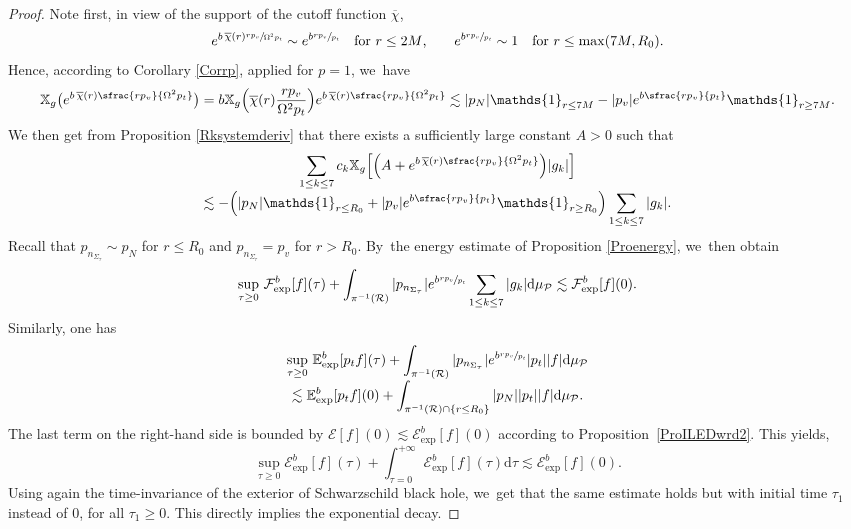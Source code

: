 \documentclass[JEP,XML,SOM,Unicode,published]{cedram}
\theoremstyle{plain}
\theoremstyle{definition}
\newcommand\T{{\mathbb{X}}}
\newcommand\dr{{\mathrm{d}}}
\begin{document}
\begin{proof}
Note first, in view of the support of the cutoff function $\overline{\chi}$,\vspace*{-3pt}
\[
e^{b \, \overline{\chi}(r) \sfrac{rp_v}{\Omega^2p_t}} \sim e^{b \sfrac{rp_v}{p_t}} \quad \text{for $r \leq 2M$,}\qquad e^{b \sfrac{rp_v}{p_t}} \sim 1 \quad \text{for $r \leq \max (7M,R_0)$}.
\]
Hence, according to Corollary \ref{Corrp}, applied for $p=1$, we~have\vspace*{-2pt}
\[
\T_g \bigl(e^{b \, \overline{\chi}(r) \sfrac{rp_v}{\Omega^2p_t}} \bigr) = b\T_g \Bigl(\overline{\chi}(r) \frac{rp_v}{\Omega^2p_t} \Bigr) e^{b \, \overline{\chi}(r) \sfrac{rp_v}{\Omega^2p_t}} \lesssim |p_N| \mathds{1}_{r \leq 7M} -|p_v| e^{b \sfrac{rp_v}{p_t}} \mathds{1}_{r \geq 7M}.
\]
We then get from Proposition \ref{Rksystemderiv} that there exists a sufficiently large constant $A>0$ such that
\begin{multline}
\sum_{1 \leq k \leq 7} c_k \T_g \Bigl[\Bigl(A+e^{b \, \overline{\chi}(r) \sfrac{rp_v}{\Omega^2p_t}} \Bigr)|g_k| \Bigr]\\[-3pt]
\lesssim -\Bigl(|p_N| \mathds{1}_{r \leq R_0} + |p_v|e^{b \sfrac{rp_v}{p_t}} \mathds{1}_{r \geq R_0} \Bigr) \sum_{1 \leq k \leq 7} |g_k|.
\end{multline}
Recall that $p_{n_{\Sigma_\tau}} \sim p_N$ for $r \leq R_0$ and $p_{n_{\Sigma_\tau}} = p_v$ for $r >R_0$. By~the energy estimate of Proposition \ref{Proenergy}, we~then obtain
\[
\sup_{\tau \geq 0}\, \mathcal{F}_{\mathrm{exp}}^b [f](\tau)+\int_{\pi^{-1}(\mathcal{R})} |p_{n_{\Sigma_\tau}}|e^{b \sfrac{rp_v}{p_t}} \sum_{1 \leq k \leq 7} |g_k| \dr \mu_{\mathcal{P}} \lesssim \mathcal{F}_{\mathrm{exp}}^b [f](0).
\]
Similarly, one has
\begin{multline*}
\sup_{\tau \geq 0} \,\mathbb{E}_{\mathrm{exp}}^b [p_t f](\tau)+\int_{\pi^{-1}(\mathcal{R})} |p_{n_{\Sigma_\tau}}|e^{b \sfrac{rp_v}{p_t}} |p_t| |f| \dr \mu_{\mathcal{P}} \\[-3pt]
\lesssim \mathbb{E}_{\mathrm{exp}}^b [p_tf](0)+\int_{\pi^{-1}(\mathcal{R})\cap \{ r \leq R_0 \}} |p_N| |p_t| |f| \dr \mu_{\mathcal{P}}.
\end{multline*}
The last term on the right-hand side is bounded by $\mathcal{E}[f](0) \lesssim \mathcal{E}_{\mathrm{exp}}^b[f](0)$ according to Proposition~\ref{ProILEDwrd2}. This yields,\vspace*{-3pt}
\[
\sup_{\tau \geq 0} \mathcal{E}_{\mathrm{exp}}^b [f](\tau)+\int_{\tau =0}^{+\infty} \mathcal{E}_{\mathrm{exp}}^b [f](\tau) \dr \tau \lesssim \mathcal{E}_{\mathrm{exp}}^b [f](0).
\]
Using again the time-invariance of the exterior of Schwarzschild black hole, we~get that the same estimate holds but with initial time $\tau_1$ instead of $0$, for all $\tau_1 \geq 0$. This directly implies the exponential decay.
\end{proof}
\end{document}
